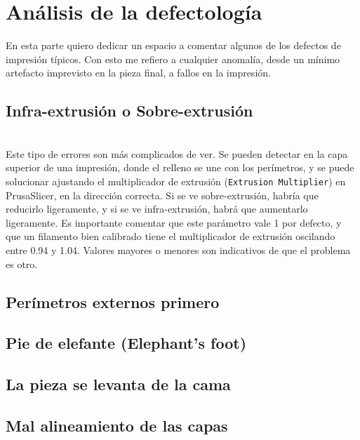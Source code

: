 \chapter{Análisis de la defectología}\label{ch:defectology}

En esta parte quiero dedicar un espacio a comentar algunos de los defectos de impresión típicos. Con esto me refiero a cualquier anomalía, desde un mínimo artefacto imprevisto en la pieza final, a fallos en la impresión. 

\section{Infra-extrusión o Sobre-extrusión}
\\
Este tipo de errores son más complicados de ver. Se pueden detectar en la capa superior de una impresión, donde el relleno se une con los perímetros, y se puede solucionar ajustando el multiplicador de extrusión (\texttt{Extrusion Multiplier}) en PrusaSlicer, en la dirección correcta. Si se ve sobre-extrusión, habría que reducirlo ligeramente, y si se ve infra-extrusión, habrá que aumentarlo ligeramente. Es importante comentar que este parámetro vale 1 por defecto, y que un filamento bien calibrado tiene el multiplicador de extrusión oscilando entre 0.94 y 1.04. Valores mayores o menores son indicativos de que el problema es otro.  

\section{Perímetros externos primero}

\section{Pie de elefante (Elephant's foot)}

\section{La pieza se levanta de la cama}

\section{Mal alineamiento de las capas}
